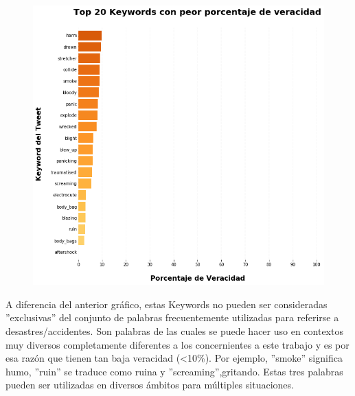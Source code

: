 \documentclass[titlepage,a4paper]{article}
\begin{document}
    \begin{figure}[H]
    \centering
    \includegraphics[width=1\textwidth]{graficos/Analisis de Keyword/top_20_keywords_con_peor_porcentaje_de_veracidad.png}
    \caption{} 
    \end{figure}
    
    A diferencia del anterior gráfico, estas Keywords no pueden ser consideradas ''exclusivas'' del conjunto de palabras frecuentemente utilizadas para referirse a desastres/accidentes. Son palabras de las cuales se puede hacer uso en contextos muy diversos completamente diferentes a los concernientes a este trabajo y es por esa razón que tienen tan baja veracidad (<10\%). Por ejemplo, ''smoke'' significa humo, ''ruin'' se traduce como ruina y ''screaming'',gritando. Estas tres palabras pueden ser utilizadas en diversos ámbitos para múltiples situaciones.
    
\end{document}
